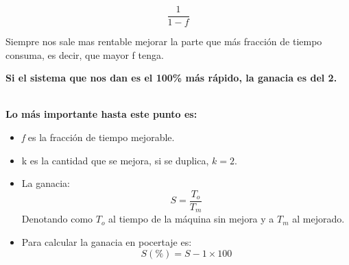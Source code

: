 \begin{equation}
    \frac{1}{1-f}
\end{equation}

Siempre nos sale mas rentable mejorar la parte que más fracción de tiempo consuma, es decir, que mayor f tenga.

\textbf{Si el sistema que nos dan es el 100\% más rápido, la ganacia es del 2.}
\\\\

\begin{tcolorbox}[colback=blue!20, colframe=blue]
\textbf{Lo más importante hasta este punto es:}

\begin{itemize}
    \item \textit{f} es la fracción de tiempo mejorable.
    \item k es la cantidad que se mejora, si se duplica, $k=2$.
    \item La ganacia: 
    \begin{equation}
        S=\frac{T_o}{T_m}
    \end{equation}
    Denotando como $T_o$ al tiempo de la máquina sin mejora y a $T_m$ al mejorado.
    \item Para calcular la ganacia en pocertaje es:
    \begin{equation}
        S(\%) = S-1 \times 100
    \end{equation}
\end{itemize}
\end{tcolorbox}

